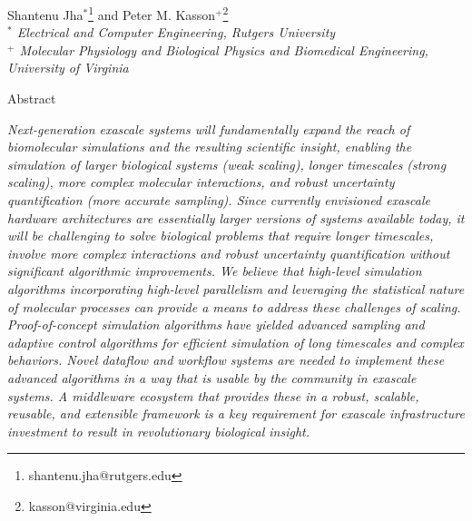 \documentclass[10pt,letterpaper,draft]{article}
\begin{document}
\thispagestyle{empty}
\begin{center} 

\vspace{0.25in}
\large Shantenu Jha$^{*}$\footnote{shantenu.jha@rutgers.edu} and Peter M. Kasson$^{+}$\footnote{kasson@virginia.edu}\\

\small {\it $^*$ Electrical and Computer Engineering, Rutgers University} \\
\small {\it $^+$ Molecular Physiology and Biological Physics and Biomedical
  Engineering, University of Virginia} \\

\vspace{0.25in}

\large Abstract

\end{center} {\it Next-generation exascale systems will fundamentally expand the
  reach of biomolecular simulations and the resulting scientific insight,
  enabling the simulation of larger biological systems (weak scaling), longer
  timescales (strong scaling), more complex molecular interactions, and robust
  uncertainty quantification (more accurate sampling).  Since currently
  envisioned exascale hardware architectures are essentially larger versions of
  systems available today, it will be challenging to solve biological problems
  that require longer timescales, involve more complex interactions and robust
  uncertainty quantification without significant algorithmic improvements.  We
  believe that high-level simulation algorithms incorporating high-level
  parallelism and leveraging the statistical nature of molecular processes can
  provide a means to address these challenges of scaling.  Proof-of-concept
  simulation algorithms have yielded advanced sampling and adaptive control
  algorithms for efficient simulation of long timescales and complex
  behaviors. Novel dataflow and workflow systems are needed to
  implement these advanced algorithms in a way that is usable by the community
  in exascale systems. A middleware ecosystem that provides these in a robust,
  scalable, reusable, and extensible framework is a key requirement for exascale
  infrastructure investment to result in revolutionary biological insight.  }

\vspace{0.15in}

\end{document}
